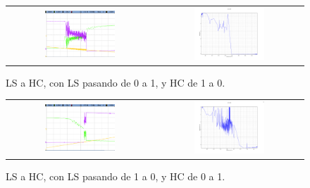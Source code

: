 \begin{figure}[H]
    \centering
    \begin{tabular}{c c}
        \includegraphics[width=0.5\textwidth]{../EJ2/Recursos/scope_32} &
        \includegraphics[width=0.5\textwidth]{../EJ2/Recursos/LS_L_v_HC_H}
    \end{tabular}
    \caption{LS a HC, con LS pasando de 0 a 1, y HC de 1 a 0.}
    \label{fig:LS_L_v_HC_H_ex5}
\end{figure}
\begin{figure}[H]
    \centering
    \begin{tabular}{c c}
        \includegraphics[width=0.5\textwidth]{../EJ2/Recursos/scope_29} &
        \includegraphics[width=0.5\textwidth]{../EJ2/Recursos/LS_H_v_HC_L}
    \end{tabular}
    \caption{LS a HC, con LS pasando de 1 a 0, y HC de 0 a 1.}
    \label{fig:LS_H_v_HC_L_ex5}
\end{figure}

